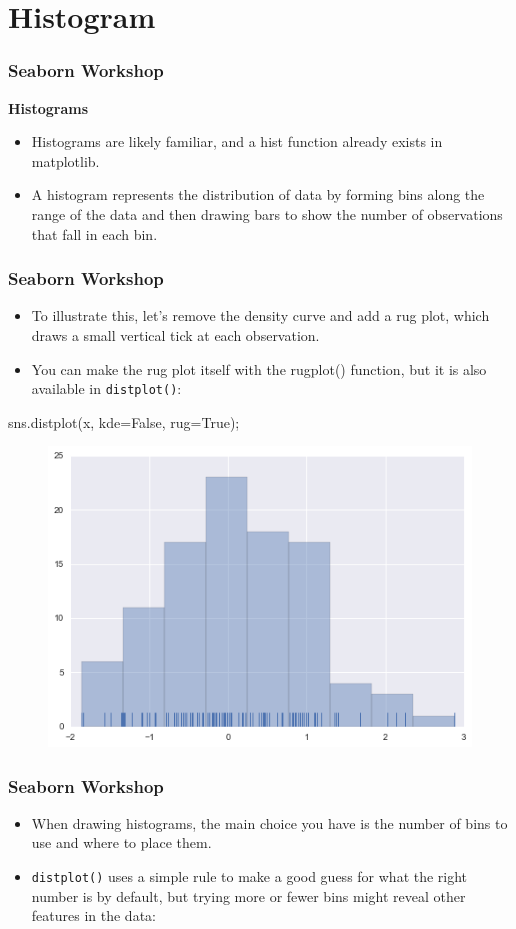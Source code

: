 \documentclass{beamer}
\begin{document}
\section{Histogram}
\begin{frame}[fragile]
	\frametitle{Seaborn Workshop}
	\large
\noindent \textbf{Histograms}
\begin{itemize}
\item Histograms are likely familiar, and a hist function already exists in matplotlib. 
\item A histogram represents the distribution of data by forming bins along the range of the data and then drawing bars to show the number of observations that fall in each bin.
\end{itemize}

\end{frame}
\begin{frame}[fragile]
	\frametitle{Seaborn Workshop}
	\large
\begin{itemize}
\item To illustrate this, let’s remove the density curve and add a rug plot, which draws a small vertical tick at each observation. 
\item You can make the rug plot itself with the rugplot() function, but it is also available in \texttt{distplot()}:
\end{itemize}


sns.distplot(x, kde=False, rug=True);
\begin{figure}
\centering
\includegraphics[width=0.7\linewidth]{images/distributions_10_0}
\end{figure}

\end{frame}
\begin{frame}[fragile]
	\frametitle{Seaborn Workshop}
	\large
	\begin{itemize}
\item When drawing histograms, the main choice you have is the number of bins to use and where to place them.
\item  \texttt{distplot()} uses a simple rule to make a good guess for what the right number is by default, but trying more or fewer bins might reveal other features in the data:
	\end{itemize}


\end{frame}
\end{document}
